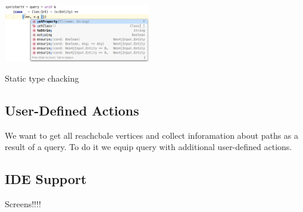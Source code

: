 \includegraphics[width=0.48\textwidth]{pictures/image1.png}


Static type chacking

\subsection{User-Defined Actions}

We want to get all reachcbale vertices and collect inforamation about paths as a result of a query.
To do it we equip query with additional user-defined actions.

\subsection{IDE Support}

Screens!!!!
